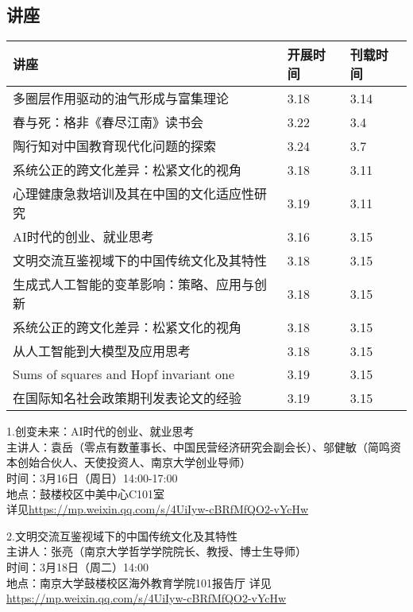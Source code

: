 \documentclass[letterpaper, 12pt]{article}
\begin{document}
\begin{multicols}{2}
\pagebreak

\section{讲座}
\begin{tabular}{|>{\centering\arraybackslash}m{}|m{}|m{}|}
    \hline
    讲座 & 开展时间 & 刊载时间\\
    \hline\hline
    多圈层作用驱动的油气形成与富集理论 & 3.18 & 3.14\\\hline
    春与死：格非《春尽江南》读书会 & 3.22 & 3.4\\\hline
    陶行知对中国教育现代化问题的探索 & 3.24 & 3.7\\\hline
    系统公正的跨文化差异：松紧文化的视角 & 3.18 & 3.11\\\hline
    心理健康急救培训及其在中国的文化适应性研究 & 3.19 & 3.11\\\hline
    AI时代的创业、就业思考 & 3.16 & 3.15\\\hline
    文明交流互鉴视域下的中国传统文化及其特性 & 3.18 & 3.15\\\hline
    生成式人工智能的变革影响：策略、应用与创新 & 3.18 & 3.15\\\hline
    系统公正的跨文化差异：松紧文化的视角 & 3.18 & 3.15\\\hline
    从人工智能到大模型及应用思考 & 3.18 & 3.15\\\hline
    Sums of squares and Hopf invariant one & 3.19 & 3.15\\\hline
    在国际知名社会政策期刊发表论文的经验 & 3.19 & 3.15\\\hline
\end{tabular}
1.创变未来：AI时代的创业、就业思考\\
主讲人：袁岳（零点有数董事长、中国民营经济研究会副会长）、邬健敏（简鸣资本创始合伙人、天使投资人、南京大学创业导师）\\
时间：3月16日（周日）14:00-17:00\\
地点：鼓楼校区中美中心C101室\\
详见\url{https://mp.weixin.qq.com/s/4UiIyw-cBRfMfQO2-vYcHw} 

2.文明交流互鉴视域下的中国传统文化及其特性\\
主讲人：张亮（南京大学哲学学院院长、教授、博士生导师）\\
时间：3月18日（周二）14:00\\
地点：南京大学鼓楼校区海外教育学院101报告厅
详见\url{https://mp.weixin.qq.com/s/4UiIyw-cBRfMfQO2-vYcHw}


\end{multicols}
\end{document}
